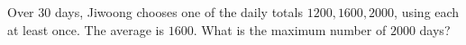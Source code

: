 Over $30$ days, Jiwoong chooses one of the daily totals $1200,1600,2000$, using each at least once. The average is $1600$. What is the maximum number of $2000$ days?
